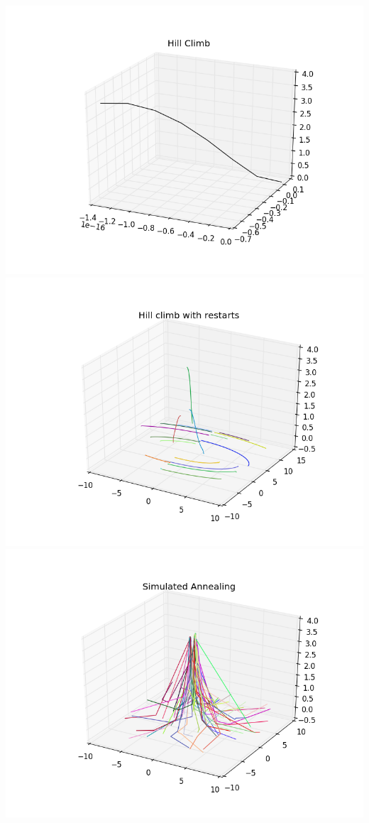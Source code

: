 \documentclass[a4paper,12pt]{article}
\begin{document}
\centering
\includegraphics[scale=0.6]{hill_climb}
\includegraphics[scale=0.6]{hill_climb_random}
\includegraphics[scale=0.6]{simulated_annealing}
\end{document}
